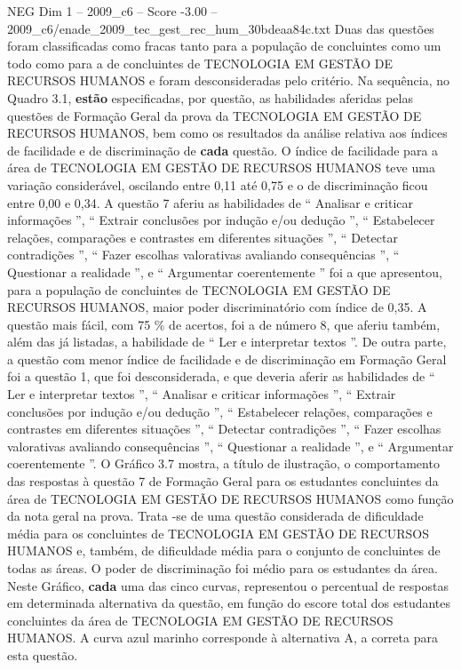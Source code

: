 \begin{textsample}{NEG Dim 1 – 2009\_c6 – Score -3.00 – 2009\_c6/enade\_2009\_tec\_gest\_rec\_hum\_30bdeaa84c.txt}
Duas das questões foram classificadas como fracas tanto para a população de concluintes como um todo como para a de concluintes de TECNOLOGIA EM GESTÃO DE RECURSOS HUMANOS e foram desconsideradas pelo critério.
Na sequência, no Quadro 3.1, \textbf{estão} especificadas, por questão, as habilidades aferidas pelas questões de Formação Geral da prova da TECNOLOGIA EM GESTÃO DE RECURSOS HUMANOS, bem como os resultados da análise relativa aos índices de facilidade e de discriminação de \textbf{cada} questão.
O índice de facilidade para a área de TECNOLOGIA EM GESTÃO DE RECURSOS HUMANOS teve uma variação considerável, oscilando entre 0,11 até 0,75 e o de discriminação ficou entre 0,00 e 0,34.
A questão 7 aferiu as habilidades de “ Analisar e criticar informações ”, “ Extrair conclusões por indução e/ou dedução ”, “ Estabelecer relações, comparações e contrastes em diferentes situações ”, “ Detectar contradições ”, “ Fazer escolhas valorativas avaliando consequências ”, “ Questionar a realidade ”, e “ Argumentar coerentemente ” foi a que apresentou, para a população de concluintes de TECNOLOGIA EM GESTÃO DE RECURSOS HUMANOS, maior poder discriminatório com índice de 0,35.
A questão mais fácil, com 75 \% de acertos, foi a de número 8, que aferiu também, além das já listadas, a habilidade de “ Ler e interpretar textos ”.
De outra parte, a questão com menor índice de facilidade e de discriminação em Formação Geral foi a questão 1, que foi desconsiderada, e que deveria aferir as habilidades de “ Ler e interpretar textos ”, “ Analisar e criticar informações ”, “ Extrair conclusões por indução e/ou dedução ”, “ Estabelecer relações, comparações e contrastes em diferentes situações ”, “ Detectar contradições ”, “ Fazer escolhas valorativas avaliando consequências ”, “ Questionar a realidade ”, e “ Argumentar coerentemente ”.
O Gráfico 3.7 mostra, a título de ilustração, o comportamento das respostas à questão 7 de Formação Geral para os estudantes concluintes da área de TECNOLOGIA EM GESTÃO DE RECURSOS HUMANOS como função da nota geral na prova.
Trata -se de uma questão considerada de dificuldade média para os concluintes de TECNOLOGIA EM GESTÃO DE RECURSOS HUMANOS e, também, de dificuldade média para o conjunto de concluintes de todas as áreas.
O poder de discriminação foi médio para os estudantes da área.
Neste Gráfico, \textbf{cada} uma das cinco curvas, representou o percentual de respostas em determinada alternativa da questão, em função do escore total dos estudantes concluintes da área de TECNOLOGIA EM GESTÃO DE RECURSOS HUMANOS.
A curva azul marinho corresponde à alternativa A, a correta para esta questão.

\end{textsample}
